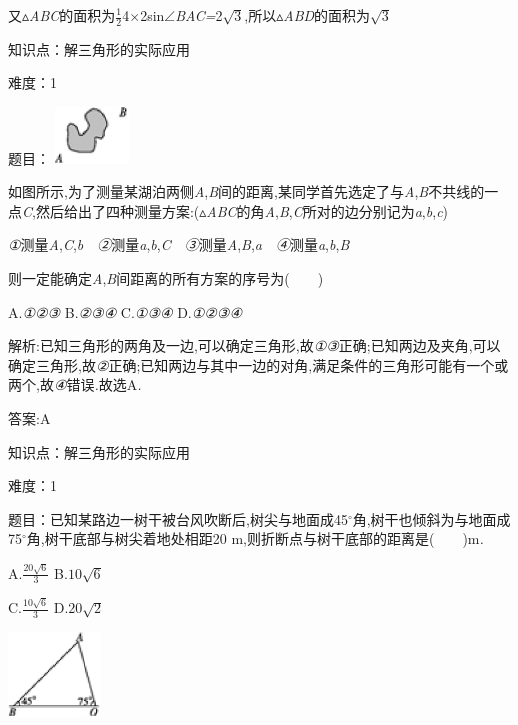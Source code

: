 \documentclass{article} %
\begin{document}
又$\mathrm{\vartriangle}$\textit{ABC}的面积为$\frac{1}{2}$4\textit{$\times$}2sin$\mathrm{\angle}$\textit{BAC=}2$\sqrt{3}$,所以$\mathrm{\vartriangle}$\textit{ABD}的面积为$\sqrt{3}$




知识点：解三角形的实际应用

难度：1

题目：
\includegraphics*[width=0.77in, height=0.59in, keepaspectratio=false]{image1056}

 如图所示,为了测量某湖泊两侧\textit{A},\textit{B}间的距离,某同学首先选定了与\textit{A},\textit{B}不共线的一点\textit{C},然后给出了四种测量方案:($\mathrm{\vartriangle}$\textit{ABC}的角\textit{A},\textit{B},\textit{C}所对的边分别记为\textit{a},\textit{b},\textit{c})

 \textit{①}测量\textit{A},\textit{C},\textit{b　②}测量\textit{a},\textit{b},\textit{C　③}测量\textit{A},\textit{B},\textit{a　④}测量\textit{a},\textit{b},\textit{B}

 则一定能确定\textit{A},\textit{B}间距离的所有方案的序号为(\textit{　　})


 A.\textit{①②③} B.\textit{②③④} C.\textit{①③④} D.\textit{①②③④}

 解析:已知三角形的两角及一边,可以确定三角形,故\textit{①③}正确;已知两边及夹角,可以确定三角形,故\textit{②}正确;已知两边与其中一边的对角,满足条件的三角形可能有一个或两个,故\textit{④}错误\textit{.}故选A\textit{.}

 答案:A

知识点：解三角形的实际应用

难度：1

 题目：已知某路边一树干被台风吹断后,树尖与地面成45$\mathrm{{}^\circ}$角,树干也倾斜为与地面成75$\mathrm{{}^\circ}$角,树干底部与树尖着地处相距20 m,则折断点与树干底部的距离是(\textit{　　})m\textit{.}



 A.$\frac{20\sqrt{6}}{3}$ B.$10\sqrt{6}$

 C.$\frac{10\sqrt{6}}{3}$ D.$20\sqrt{2}$

 \includegraphics*[width=0.97in, height=0.89in, keepaspectratio=false]{image1061}
\end{document}
